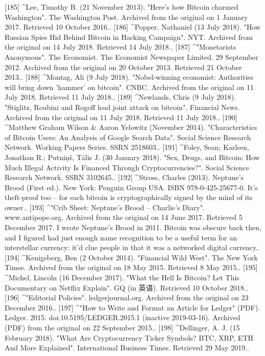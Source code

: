 [185]
^Lee, Timothy B. (21 November 2013). "Here's how Bitcoin charmed Washington". The Washington Post. Archived from the original on 1 January 2017. Retrieved 10 October 2016..
[186]
^Popper, Nathaniel (13 July 2018). "How Russian Spies Hid Behind Bitcoin in Hacking Campaign". NYT. Archived from the original on 14 July 2018. Retrieved 14 July 2018..
[187]
^"Monetarists Anonymous". The Economist. The Economist Newspaper Limited. 29 September 2012. Archived from the original on 20 October 2013. Retrieved 21 October 2013..
[188]
^Montag, Ali (9 July 2018). "Nobel-winning economist: Authorities will bring down 'hammer' on bitcoin". CNBC. Archived from the original on 11 July 2018. Retrieved 11 July 2018..
[189]
^Newlands, Chris (9 July 2018). "Stiglitz, Roubini and Rogoff lead joint attack on bitcoin". Financial News. Archived from the original on 11 July 2018. Retrieved 11 July 2018..
[190]
^Matthew Graham Wilson & Aaron Yelowitz (November 2014). "Characteristics of Bitcoin Users: An Analysis of Google Search Data". Social Science Research Network. Working Papers Series. SSRN 2518603..
[191]
^Foley, Sean; Karlsen, Jonathan R.; Putniņš, Tālis J. (30 January 2018). "Sex, Drugs, and Bitcoin: How Much Illegal Activity Is Financed Through Cryptocurrencies?". Social Science Research Network. SSRN 3102645..
[192]
^Stross, Charles (2013). Neptune's Brood (First ed.). New York: Penguin Group USA. ISBN 978-0-425-25677-0. It's theft-proof too – for each bitcoin is cryptographically signed by the mind of its owner..
[193]
^"Crib Sheet: Neptune's Brood – Charlie's Diary". www.antipope.org. Archived from the original on 14 June 2017. Retrieved 5 December 2017. I wrote Neptune's Brood in 2011. Bitcoin was obscure back then, and I figured had just enough name recognition to be a useful term for an interstellar currency: it'd clue people in that it was a networked digital currency..
[194]
^Kenigsberg, Ben (2 October 2014). "Financial Wild West". The New York Times. Archived from the original on 18 May 2015. Retrieved 8 May 2015..
[195]
^Michel, Lincoln (16 December 2017). "What the Hell Is Bitcoin? Let This Documentary on Netflix Explain". GQ (in 英语). Retrieved 10 October 2018..
[196]
^"Editorial Policies". ledgerjournal.org. Archived from the original on 23 December 2016..
[197]
^"How to Write and Format an Article for Ledger" (PDF). Ledger. 2015. doi:10.5195/LEDGER.2015.1 (inactive 2019-03-16). Archived (PDF) from the original on 22 September 2015..
[198]
^Dellinger, A. J. (15 February 2018). "What Are Cryptocurrency Ticker Symbols? BTC, XRP, ETH And More Explained". International Business Times. Retrieved 29 May 2019..
